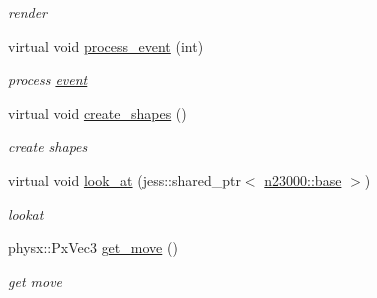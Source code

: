 \begin{DoxyCompactItemize}
\begin{DoxyCompactList}\small\item\em render \item\end{DoxyCompactList}\item 
virtual void \hyperlink{classnebula_1_1content_1_1actor_1_1admin_1_1controller_a0ed008079e8d68dd6b7e271b71c91f29}{process\_\-event} (int)
\begin{DoxyCompactList}\small\item\em process \hyperlink{structnebula_1_1content_1_1actor_1_1admin_1_1controller_1_1event}{event} \item\end{DoxyCompactList}\item 
virtual void \hyperlink{classnebula_1_1content_1_1actor_1_1admin_1_1controller_a8f4df19230f21a264d3325a5fcd5c1fa}{create\_\-shapes} ()
\begin{DoxyCompactList}\small\item\em create shapes \item\end{DoxyCompactList}\item 
virtual void \hyperlink{classnebula_1_1content_1_1actor_1_1admin_1_1controller_ab59443a22c4da36f6b8996c90cd75c37}{look\_\-at} (jess::shared\_\-ptr$<$ \hyperlink{classnebula_1_1platform_1_1renderer_1_1base}{n23000::base} $>$)
\begin{DoxyCompactList}\small\item\em lookat \item\end{DoxyCompactList}\item 
physx::PxVec3 \hyperlink{classnebula_1_1content_1_1actor_1_1admin_1_1controller_a6caff8dfe06a73d8c60189c49fe0ff5c}{get\_\-move} ()
\begin{DoxyCompactList}\small\item\em get move \item\end{DoxyCompactList}\end{DoxyCompactItemize}
